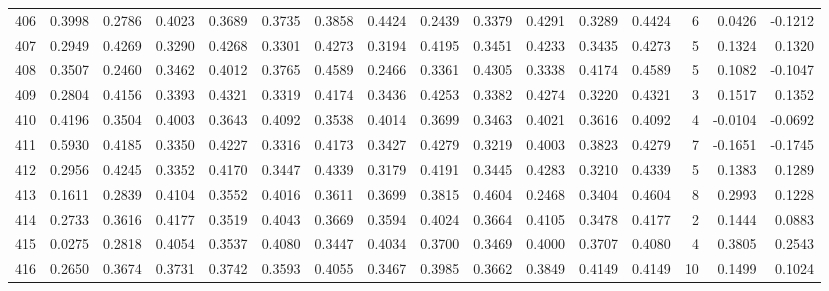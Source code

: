 \begin{tabular}{lrrrrrrrrrrrrrrr}
406 &      0.3998 &  0.2786 &  0.4023 &  0.3689 &  0.3735 &  0.3858 &  0.4424 &  0.2439 &  0.3379 &  0.4291 &   0.3289 &     0.4424 &      6 &                    0.0426 &                    -0.1212 \\
407 &      0.2949 &  0.4269 &  0.3290 &  0.4268 &  0.3301 &  0.4273 &  0.3194 &  0.4195 &  0.3451 &  0.4233 &   0.3435 &     0.4273 &      5 &                    0.1324 &                     0.1320 \\
408 &      0.3507 &  0.2460 &  0.3462 &  0.4012 &  0.3765 &  0.4589 &  0.2466 &  0.3361 &  0.4305 &  0.3338 &   0.4174 &     0.4589 &      5 &                    0.1082 &                    -0.1047 \\
409 &      0.2804 &  0.4156 &  0.3393 &  0.4321 &  0.3319 &  0.4174 &  0.3436 &  0.4253 &  0.3382 &  0.4274 &   0.3220 &     0.4321 &      3 &                    0.1517 &                     0.1352 \\
410 &      0.4196 &  0.3504 &  0.4003 &  0.3643 &  0.4092 &  0.3538 &  0.4014 &  0.3699 &  0.3463 &  0.4021 &   0.3616 &     0.4092 &      4 &                   -0.0104 &                    -0.0692 \\
411 &      0.5930 &  0.4185 &  0.3350 &  0.4227 &  0.3316 &  0.4173 &  0.3427 &  0.4279 &  0.3219 &  0.4003 &   0.3823 &     0.4279 &      7 &                   -0.1651 &                    -0.1745 \\
412 &      0.2956 &  0.4245 &  0.3352 &  0.4170 &  0.3447 &  0.4339 &  0.3179 &  0.4191 &  0.3445 &  0.4283 &   0.3210 &     0.4339 &      5 &                    0.1383 &                     0.1289 \\
413 &      0.1611 &  0.2839 &  0.4104 &  0.3552 &  0.4016 &  0.3611 &  0.3699 &  0.3815 &  0.4604 &  0.2468 &   0.3404 &     0.4604 &      8 &                    0.2993 &                     0.1228 \\
414 &      0.2733 &  0.3616 &  0.4177 &  0.3519 &  0.4043 &  0.3669 &  0.3594 &  0.4024 &  0.3664 &  0.4105 &   0.3478 &     0.4177 &      2 &                    0.1444 &                     0.0883 \\
415 &      0.0275 &  0.2818 &  0.4054 &  0.3537 &  0.4080 &  0.3447 &  0.4034 &  0.3700 &  0.3469 &  0.4000 &   0.3707 &     0.4080 &      4 &                    0.3805 &                     0.2543 \\
416 &      0.2650 &  0.3674 &  0.3731 &  0.3742 &  0.3593 &  0.4055 &  0.3467 &  0.3985 &  0.3662 &  0.3849 &   0.4149 &     0.4149 &     10 &                    0.1499 &                     0.1024 \\

\end{tabular}
